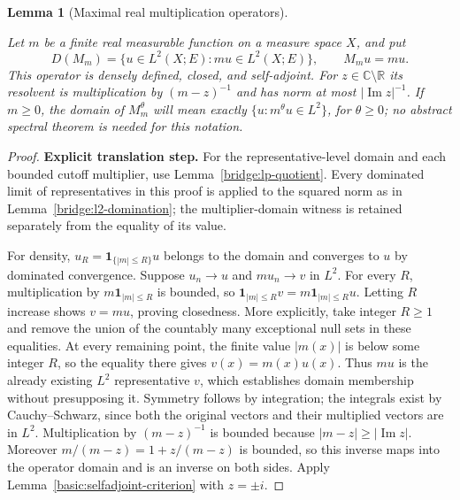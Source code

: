 \documentclass[11pt,a4paper]{article}
\newtheorem{lemma}[theorem]{Lemma}
\theoremstyle{definition}
\theoremstyle{remark}
\newcommand{\proofid}[1]{\par\smallskip{\normalfont\scriptsize\color{inkblue}Stable ID: \nolinkurl{#1}}\par\smallskip}
\begin{document}
\begin{lemma}[Maximal real multiplication operators]
\label{basic:multiplier}
\proofid{basic:multiplier}
\par{}\par\smallskip
\label{basic:multiplier_closed}
Let $m$ be a finite real measurable function on a measure space $X$, and put
\[
 D(M_m)=\{u\in L^2(X;E):mu\in L^2(X;E)\},\qquad M_mu=mu.
\]
This operator is densely defined, closed, and self-adjoint. For
$z\in\mathbb C\setminus\mathbb R$ its resolvent is multiplication by
$(m-z)^{-1}$ and has norm at most $|\operatorname{Im}z|^{-1}$.
If $m\geq0$, the domain of $M_m^\theta$ will mean exactly
$\{u:m^\theta u\in L^2\}$, for $\theta\geq0$; no abstract spectral theorem
is needed for this notation.
\end{lemma}
\begin{proof}
\noindent\textbf{Explicit translation step.} For the representative-level domain and each bounded cutoff multiplier,
use Lemma~\ref{bridge:lp-quotient}. Every dominated limit of representatives
in this proof is applied to the squared norm as in
Lemma~\ref{bridge:l2-domination}; the multiplier-domain witness is retained
separately from the equality of its value.

For density, $u_R=\mathbf1_{\{|m|\leq R\}}u$ belongs to the domain and
converges to $u$ by dominated convergence. Suppose $u_n\to u$ and
$mu_n\to v$ in $L^2$. For every $R$, multiplication by
$m\mathbf1_{|m|\leq R}$ is bounded, so
$\mathbf1_{|m|\leq R}v=m\mathbf1_{|m|\leq R}u$. Letting $R$ increase
shows $v=mu$, proving closedness. More explicitly, take integer
$R\geq1$ and remove the union of the countably many exceptional null
sets in these equalities. At every remaining point, the finite value
$|m(x)|$ is below some integer $R$, so the equality there gives
$v(x)=m(x)u(x)$. Thus $mu$ is the already existing $L^2$ representative
$v$, which establishes domain membership without presupposing it.
Symmetry follows by integration; the integrals exist by Cauchy--Schwarz,
since both the original vectors and their multiplied vectors are in $L^2$.
Multiplication by $(m-z)^{-1}$ is bounded because $|m-z|\geq|\operatorname{Im}z|$.
Moreover $m/(m-z)=1+z/(m-z)$ is bounded, so this inverse maps into the
operator domain and is an inverse on both sides. Apply
Lemma~\ref{basic:selfadjoint-criterion} with $z=\pm i$.
\end{proof}
\end{document}
